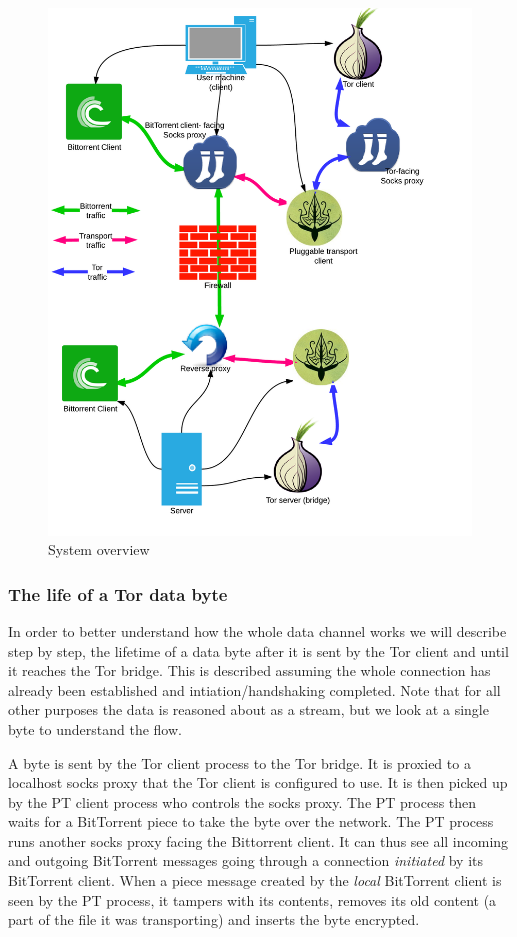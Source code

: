 \documentclass[11pt]{article} %
\begin{document}
\begin{figure}[h!]
\begin{center}
\includegraphics[scale=0.23]{FuinSystemArchitecture}
\end{center}
 \caption{System overview}
 \label{fig:system_architecture}
 \end{figure}

\subsubsection{The life of a Tor data byte}

In order to better understand how the whole data channel works we will describe step by step, the lifetime of a data byte after it is sent by the Tor client and until it reaches the Tor bridge. This is described assuming the whole connection has already been established and intiation/handshaking completed. Note that for all other purposes the data is reasoned about as a stream, but we look at a single byte to understand the flow.

A byte is sent by the Tor client process to the Tor bridge. It is proxied to a localhost socks proxy that the Tor client is configured to use. It is then picked up by the PT client process who controls the socks proxy. The PT process then waits for a BitTorrent piece to take the byte over the network. The PT process runs another socks proxy facing the Bittorrent client. It can thus see all incoming and outgoing BitTorrent messages going through a connection \textit{initiated} by its BitTorrent client. When a piece message created by the \textit{local} BitTorrent client is seen by the PT process, it tampers with its contents, removes its old content (a part of the file it was transporting) and inserts the byte encrypted.  
\end{document}

